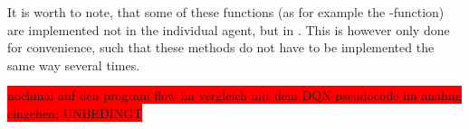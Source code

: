 It is worth to note, that some of these functions (as for example the -function) are implemented not in the individual agent, but in . This is however only done for convenience, such that these methods do not have to be implemented the same way several times.





%
%
%




%
%



\colorbox{red}{nochmal auf den program flow im vergleich mit dem DQN-pseudocode im anahng eingehen; UNBEDINGT}

